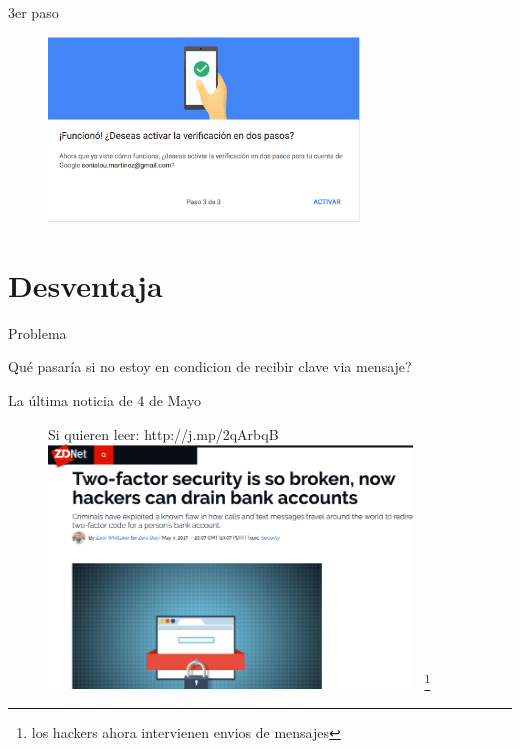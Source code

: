 \documentclass[11pt]{beamer}
\let\oldfootnote\footnote
\renewcommand\footnote[1][]{\oldfootnote[frame,#1]}
\begin{document}
\begin{frame}{3er paso}
  \begin{figure}
    \includegraphics[width=3.25in]{images/3paso.png}
  \end{figure}
\end{frame}
\section{Desventaja}
\begin{frame}{Problema}
  \begin{alertblock}{Qu\'e pasar\'ia si no estoy en condicion de recibir clave via mensaje?}
  \end{alertblock}
\end{frame}
\begin{frame}{La \'ultima noticia  de 4 de Mayo}
  \begin{figure}{Si quieren leer: http://j.mp/2qArbqB}
    \includegraphics[width=3.8in]{images/ZDNet-2fa.png}
      ~\footnote{los hackers ahora intervienen envios de mensajes}
  \end{figure}
\end{frame}
\end{document}
